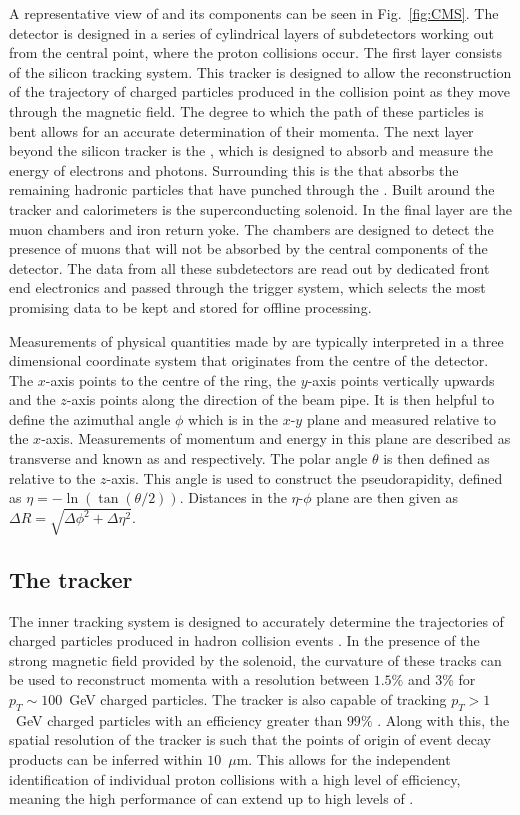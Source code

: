 A representative view of \CMS and its components can be seen in
Fig.~\ref{fig:CMS}. The detector is designed in a series of
cylindrical layers of subdetectors working out from the central point,
where the proton collisions occur. The first layer consists of the
silicon tracking system. This tracker is designed to allow the
reconstruction of the trajectory of charged particles produced in the
collision point as they move through the magnetic field. The degree to
which the path of these particles is bent allows for an accurate
determination of their momenta. The next layer beyond the silicon
tracker is the \ECAL, which is designed to absorb and measure the
energy of electrons and photons. Surrounding this is the \HCAL that
absorbs the remaining hadronic particles that have punched through the
\ECAL. Built around the tracker and calorimeters is the superconducting
solenoid. In the final layer are the muon chambers and iron return
yoke. The chambers are designed to detect the presence of muons that
will not be absorbed by the central components of the detector. The
data from all these subdetectors are read out by dedicated front end
electronics and passed through the \CMS trigger system, which
selects the most promising data to be kept and stored for offline
processing. 

Measurements of physical quantities made by \CMS are typically
interpreted in a three dimensional coordinate system that originates
from the centre of the detector. The $x$-axis points to the
centre of the \LHC ring, the $y$-axis points vertically upwards and
the $z$-axis points along the direction of the \LHC beam pipe. It is
then helpful to define the azimuthal angle $\phi$ which is in the
$x$-$y$ plane and measured relative to the $x$-axis. Measurements of
momentum and energy in this plane are described as transverse and
known as \pt and \Et respectively. The polar angle $\theta$ is then
defined as relative to the $z$-axis. This angle is used to construct
the pseudorapidity, defined as $\eta=-\ln(\tan(\theta/2))$. Distances in
the $\eta$-$\phi$ plane are then given as $\Delta R =
\sqrt{\Delta\phi^2+\Delta\eta^2}$.

\subsection{The tracker} 

The \CMS inner tracking system is designed to accurately determine the
trajectories of charged particles produced in hadron collision events
\cite{Karimaki:368412}. In the presence of the strong magnetic field
provided by the \CMS solenoid, the curvature of these tracks can be
used to reconstruct momenta with a resolution between $1.5\%$ and
$3\%$ for $p_T\sim 100$~GeV charged particles. The tracker is also
capable of tracking \mbox{$p_T>1$~GeV} charged particles with an
efficiency greater than $99\%$ \cite{Bayatian:2006zz}. Along with
this, the spatial resolution of the tracker is such that the points of
origin of event decay products can be inferred within $10$~$\mu$m.
This allows for the independent identification of individual proton
collisions with a high level of efficiency, meaning the high
performance of \CMS can extend up to high levels
of \PU.%

